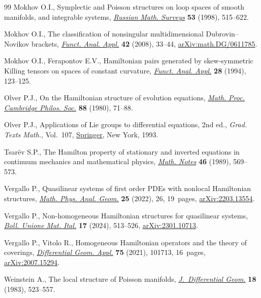 \begin{thebibliography}{99}
Mokhov O.I., Symplectic and {P}oisson structures on loop spaces of smooth
 manifolds, and integrable systems, \href{https://doi.org/10.1070/RM1998v053n03ABEH000019}{\textit{Russian Math. Surveys}} \textbf{53}
 (1998), 515--622.

Mokhov O.I., The classification of nonsingular multidimensional
 {D}ubrovin--{N}ovikov brackets, \href{https://doi.org/10.1007/s10688-008-0004-8}{\textit{Funct. Anal. Appl.}} \textbf{42}
 (2008), 33--44, \href{https://arxiv.org/abs/math.DG/0611785}{arXiv:math.DG/0611785}.

Mokhov O.I., Ferapontov E.V., Hamiltonian pairs generated by skew-symmetric
 {K}illing tensors on spaces of constant curvature, \href{https://doi.org/10.1007/BF01076502}{\textit{Funct. Anal.
 Appl.}} \textbf{28} (1994), 123--125.

Olver P.J., On the {H}amiltonian structure of evolution equations,
 \href{https://doi.org/10.1017/S0305004100057364}{\textit{Math. Proc. Cambridge Philos. Soc.}} \textbf{88} (1980), 71--88.

Olver P.J., Applications of {L}ie groups to differential equations, 2nd ed.,
 \textit{Grad. Texts Math.}, Vol.~107, \href{https://doi.org/10.1007/978-1-4612-4350-2}{Springer}, New York, 1993.

Tsar\"ev S.P., The {H}amilton property of stationary and inverted equations in
 continuum mechanics and mathematical physics, \href{https://doi.org/10.1007/BF01159109}{\textit{Math. Notes}}
 \textbf{46} (1989), 569--573.

Vergallo P., Quasilinear systems of first order {PDE}s with nonlocal
 {H}amiltonian structures, \href{https://doi.org/10.1007/s11040-022-09438-1}{\textit{Math. Phys. Anal. Geom.}} \textbf{25}
 (2022), 26, 19~pages, \href{https://arxiv.org/abs/2203.13554}{arXiv:2203.13554}.

Vergallo P., Non-homogeneous {H}amiltonian structures for quasilinear systems,
 \href{https://doi.org/10.1007/s40574-023-00369-5}{\textit{Boll. Unione Mat. Ital.}} \textbf{17} (2024), 513--526,
 \href{https://arxiv.org/abs/2301.10713}{arXiv:2301.10713}.

Vergallo P., Vitolo R., Homogeneous {H}amiltonian operators and the theory of
 coverings, \href{https://doi.org/10.1016/j.difgeo.2020.101713}{\textit{Differential Geom. Appl.}} \textbf{75} (2021), 101713,
 16~pages, \href{https://arxiv.org/abs/2007.15294}{arXiv:2007.15294}.

Weinstein A., The local structure of {P}oisson manifolds,
 \href{https://doi.org/10.4310/jdg/1214437787}{\textit{J.~Differential Geom.}} \textbf{18} (1983), 523--557.

\end{thebibliography}
